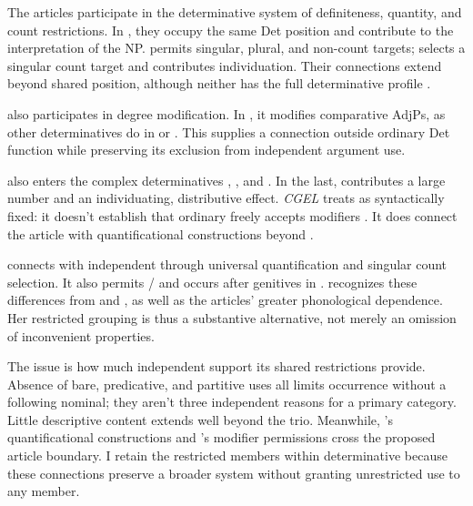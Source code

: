 \documentclass[12pt]{article}
\begin{document}
The articles participate in the determinative system of definiteness, quantity, and count restrictions. In , they occupy the same Det position and contribute to the interpretation of the NP.  permits singular, plural, and non-count targets;  selects a singular count target and contributes individuation. Their connections extend beyond shared position, although neither has the full determinative profile \citep[368--373]{huddleston2002}.

 also participates in degree modification. In , it modifies comparative AdjPs, as other determinatives do in  or  \citep[1131--1132, 1135--1136]{huddleston2002}. This supplies a connection outside ordinary Det function while preserving its exclusion from independent argument use.

 also enters the complex determinatives , , and . In the last,  contributes a large number and  an individuating, distributive effect. \textit{CGEL} treats  as syntactically fixed: it doesn't establish that ordinary  freely accepts modifiers \citep[392--394]{huddleston2002}. It does connect the article with quantificational constructions beyond .

 connects with independent  through universal quantification and singular count selection. It also permits / and occurs after genitives in . \textcite[156--158]{spinillo2004reconceptualising} recognizes these differences from  and , as well as the articles' greater phonological dependence. Her restricted grouping is thus a substantive alternative, not merely an omission of inconvenient properties.

The issue is how much independent support its shared restrictions provide. Absence of bare, predicative, and partitive uses all limits occurrence without a following nominal; they aren't three independent reasons for a primary category. Little descriptive content extends well beyond the trio. Meanwhile, 's quantificational constructions and 's modifier permissions cross the proposed article boundary. I retain the restricted members within determinative because these connections preserve a broader system without granting unrestricted use to any member.
\end{document}
